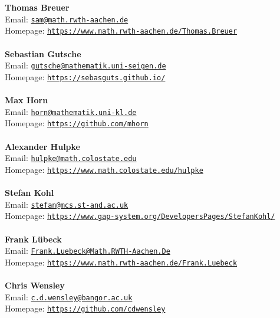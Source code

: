 \documentclass[a4paper,11pt]{report}
\begin{document}
\begin{titlepage}
\mbox{}\\
{\mbox{}\\
\small \noindent \textbf{ Thomas Breuer\\
   }  Email: \href{mailto://sam@math.rwth-aachen.de} {\texttt{sam@math.rwth-aachen.de}}\\
  Homepage: \href{https://www.math.rwth-aachen.de/~Thomas.Breuer} {\texttt{https://www.math.rwth-aachen.de/\texttt{}Thomas.Breuer}}}\\
{\mbox{}\\
\small \noindent \textbf{ Sebastian Gutsche\\
   }  Email: \href{mailto://gutsche@mathematik.uni-seigen.de} {\texttt{gutsche@mathematik.uni-seigen.de}}\\
  Homepage: \href{https://sebasguts.github.io/} {\texttt{https://sebasguts.github.io/}}}\\
{\mbox{}\\
\small \noindent \textbf{ Max Horn\\
   }  Email: \href{mailto://horn@mathematik.uni-kl.de} {\texttt{horn@mathematik.uni-kl.de}}\\
  Homepage: \href{https://github.com/mhorn} {\texttt{https://github.com/mhorn}}}\\
{\mbox{}\\
\small \noindent \textbf{ Alexander Hulpke\\
   }  Email: \href{mailto://hulpke@math.colostate.edu} {\texttt{hulpke@math.colostate.edu}}\\
  Homepage: \href{https://www.math.colostate.edu/~hulpke} {\texttt{https://www.math.colostate.edu/\texttt{}hulpke}}}\\
{\mbox{}\\
\small \noindent \textbf{ Stefan Kohl\\
   }  Email: \href{mailto://stefan@mcs.st-and.ac.uk} {\texttt{stefan@mcs.st-and.ac.uk}}\\
  Homepage: \href{https://www.gap-system.org/DevelopersPages/StefanKohl/} {\texttt{https://www.gap-system.org/DevelopersPages/StefanKohl/}}}\\
{\mbox{}\\
\small \noindent \textbf{ Frank L{\"u}beck\\
   }  Email: \href{mailto://Frank.Luebeck@Math.RWTH-Aachen.De} {\texttt{Frank.Luebeck@Math.RWTH-Aachen.De}}\\
  Homepage: \href{https://www.math.rwth-aachen.de/~Frank.Luebeck} {\texttt{https://www.math.rwth-aachen.de/\texttt{}Frank.Luebeck}}}\\
{\mbox{}\\
\small \noindent \textbf{ Chris Wensley\\
   }  Email: \href{mailto://c.d.wensley@bangor.ac.uk} {\texttt{c.d.wensley@bangor.ac.uk}}\\
  Homepage: \href{https://github.com/cdwensley} {\texttt{https://github.com/cdwensley}}}\\
\end{titlepage}
\end{document}
